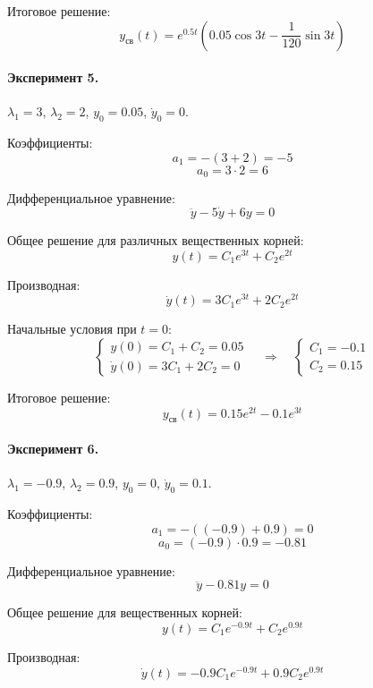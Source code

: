 \documentclass[14pt,a4paper]{extarticle}
\begin{document}
Итоговое решение:
\begin{equation}
  y_{\text{св}}(t) = e^{0.5t}\left(0.05 \cos 3t - \frac{1}{120} \sin 3t\right)
\end{equation}


\paragraph{Эксперимент 5.} $\lambda_1=3$, $\lambda_2=2$, $y_0=0.05$, $\dot y_0=0$.

Коэффициенты:
\[
  a_1 = -(3 + 2) = -5
\]
\[
  a_0 = 3 \cdot 2 = 6
\]

Дифференциальное уравнение:
\begin{equation}
  \ddot y - 5\dot y + 6y = 0
\end{equation}

Общее решение для различных вещественных корней:
\[
  y(t) = C_1 e^{3t} + C_2 e^{2t}
\]

Производная:
\[
  \dot y(t) = 3C_1 e^{3t} + 2C_2 e^{2t}
\]

Начальные условия при $t = 0$:
\[
  \begin{cases}
    y(0) = C_1 + C_2 = 0.05 \\
    \dot y(0) = 3C_1 + 2C_2 = 0
  \end{cases}
  \quad\Rightarrow\quad
  \begin{cases}
    C_1 = -0.1 \\
    C_2 = 0.15
  \end{cases}
\]

Итоговое решение:
\begin{equation}
  y_{\text{св}}(t) = 0.15e^{2t} - 0.1e^{3t}
\end{equation}


\paragraph{Эксперимент 6.} $\lambda_1=-0.9$, $\lambda_2=0.9$, $y_0=0$, $\dot y_0=0.1$.

Коэффициенты:
\[
  a_1 = -((-0.9) + 0.9) = 0
\]
\[
  a_0 = (-0.9) \cdot 0.9 = -0.81
\]

Дифференциальное уравнение:
\begin{equation}
  \ddot y - 0.81y = 0
\end{equation}

Общее решение для вещественных корней:
\[
  y(t) = C_1 e^{-0.9t} + C_2 e^{0.9t}
\]

Производная:
\[
  \dot y(t) = -0.9C_1 e^{-0.9t} + 0.9C_2 e^{0.9t}
\]
\end{document}
